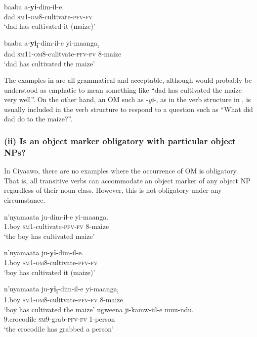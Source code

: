 \documentclass[output=paper]{langscibook}
\begin{document}
\ex\label{ex:ngunga:49b} \gll baaba    a-\textbf{yi}{}-dim-il-e.\\
  dad  {\textsc{sm}1\textsc{}-\textsc{om}8}{}-cultivate-{\textsc{pfv}-\textsc{fv}}  \\
\glt  ‘dad has cultivated it (maize)’  

\ex\label{ex:ngunga:49c} \gll baaba    a-\textbf{yi\textsubscript{i}}{}-dim-il-e      yi-maanga\textsubscript{i}\\
  dad  {\textsc{sm1}1\textsc{}-\textsc{om}8}{}-culitvate-{\textsc{pfv}-\textsc{fv}}  {8}{}-maize\\
\glt  ‘dad has cultivated the maize’  
    \z
\z

The examples in  are all grammatical and acceptable, although  would probably be understood as emphatic to mean something like “dad has cultivated the maize very well”. On the other hand, an OM such as -\textit{yi}{}-, as in the verb structure in , is usually included in the verb structure to respond to a question such as “What did dad do to the maize?”. 

\subsubsection{(ii) Is an object marker obligatory with particular object NPs?}

In Ciyaawo, there are no examples where the occurrence of OM is obligatory. That is, all transitive verbs can accommodate an object marker of any object NP regardless of their noun class. However, this is not obligatory under any circumstance.

\ea\label{ex:ngunga:50}
\ea\label{ex:ngunga:50a} \gll  n’nyamaata    ju-dim-il-e    yi-maanga.\\
{\textsc1}.boy    {\textsc{sm}1\textsc{}-}cultivate-{\textsc{pfv}-\textsc{fv}}  {8}{}-maize\\
\glt  ‘the boy has cultivated maize’    

\ex\label{ex:ngunga:50b} \gll n’nyamaata  ju-\textbf{yi}{}-dim-il-e.\\
  {\textsc{}1}.boy  {\textsc{sm}1\textsc{}-\textsc{om}8}{}-cultivate-{\textsc{pfv}-\textsc{fv}}  \\
\glt  ‘boy has cultivated it (maize)’  

\ex\label{ex:ngunga:50c} \gll n’nyamaata  ju-\textbf{yi\textsubscript{i}}{}-dim-il-e      yi-maanga\textsubscript{i}\\
  {\textsc{}1}.boy  {\textsc{sm1}\textsc{}-\textsc{om}8}{}-culitvate-{\textsc{pfv}-\textsc{fv}}  {8}{}-maize\\
\glt  ‘boy has cultivated the maize’  
    \z
\ex\label{ex:ngunga:51}
\ea\label{ex:ngunga:51a} \gll   ngweena  ji-kamw-iil-e    muu-ndu.\\
   {\textsc{}9}.crocodile  {\textsc{sm}9\textsc{}-}grab-{\textsc{pfv}-\textsc{fv}}  {1}{}-person\\
\glt  ‘the crocodile has grabbed a person’    
\end{document}
